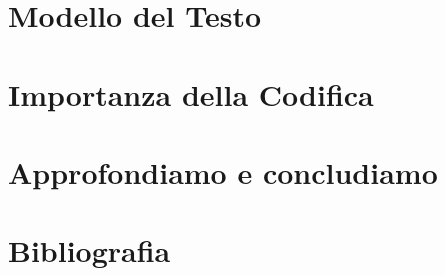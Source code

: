 \documentclass{beamer}
\begin{document}
\section{Modello del Testo}


\section{Importanza della Codifica}


%

\section{Approfondiamo e concludiamo}



%

\section*{Bibliografia}

\end{document}
